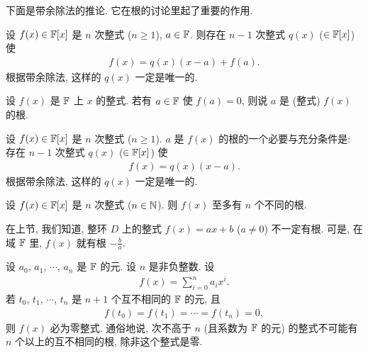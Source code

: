 下面是带余除法的推论. 它在根的讨论里起了重要的作用.

\begin{proposition}
    设 $f(x) \in \mathbb{F}[x]$ 是 $n$ 次整式 ($n \geq 1$), $a \in \mathbb{F}$. 则存在 $n-1$ 次整式 $q(x)$ ($\in \mathbb{F}[x]$) 使
    \begin{align*}
        f(x) = q(x) (x-a) + f(a).
    \end{align*}
    根据带余除法, 这样的 $q(x)$ 一定是唯一的.
\end{proposition}

\begin{definition}
    设 $f(x)$ 是 $\mathbb{F}$ 上 $x$ 的整式. 若有 $a \in \mathbb{F}$ 使 $f(a) = 0$, 则说 $a$ 是 (整式) $f(x)$ 的根.
\end{definition}

\begin{proposition}
    设 $f(x) \in \mathbb{F}[x]$ 是 $n$ 次整式 ($n \geq 1$). $a$ 是 $f(x)$ 的根的一个必要与充分条件是: 存在 $n-1$ 次整式 $q(x)$ ($\in \mathbb{F}[x]$) 使
    \begin{align*}
        f(x) = q(x) (x-a).
    \end{align*}
    根据带余除法, 这样的 $q(x)$ 一定是唯一的.
\end{proposition}

\begin{proposition}
    设 $f(x) \in \mathbb{F}[x]$ 是 $n$ 次整式 ($n \in \mathbb{N}$). 则 $f(x)$ 至多有 $n$ 个不同的根.
\end{proposition}

\begin{remark}
    在上节, 我们知道, 整环 $D$ 上的整式 $f(x) = ax + b$ ($a \neq 0$) 不一定有根. 可是, 在域 $\mathbb{F}$ 里, $f(x)$ 就有根 $-\frac{b}{a}$.
\end{remark}

\begin{proposition}
    设 $a_0$, $a_1$, $\cdots$, $a_n$ 是 $\mathbb{F}$ 的元. 设 $n$ 是非负整数. 设
    \begin{align*}
        f(x) = \sum_{i = 0}^n a_i x^i.
    \end{align*}
    若 $t_0$, $t_1$, $\cdots$, $t_n$ 是 $n+1$ 个互不相同的 $\mathbb{F}$ 的元, 且
    \begin{align*}
        f(t_0) = f(t_1) = \cdots = f(t_n) = 0,
    \end{align*}
    则 $f(x)$ 必为零整式. 通俗地说, 次不高于 $n$ (且系数为 $\mathbb{F}$ 的元) 的整式不可能有 $n$ 个以上的互不相同的根, 除非这个整式是零.
\end{proposition}

